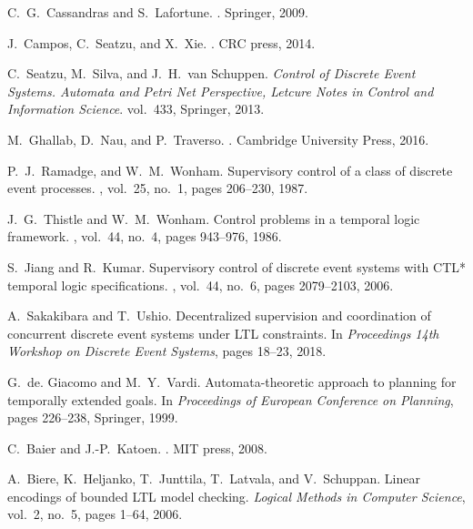 \documentclass{article}
\begin{document}
\begin{thebibliography}{99}

%
C.~G.~Cassandras and S.~Lafortune.
.
\newblock Springer, 2009.

%
J.~Campos, C.~Seatzu, and X.~Xie.
.
\newblock CRC press, 2014.

%
C.~Seatzu, M.~Silva, and J.~H.~van Schuppen.
\newblock \emph{Control of Discrete Event Systems. Automata and Petri Net Perspective, Letcure Notes in Control and Information Science}. vol.~433,
\newblock Springer, 2013.

M.~Ghallab, D.~Nau, and P.~Traverso.
.
\newblock Cambridge University Press, 2016.

%
P.~J.~Ramadge, and W.~M.~Wonham.
\newblock Supervisory control of a class of discrete event processes.
, vol.~25, no.~1, pages 206--230, 1987.

%
J.~G.~Thistle and W.~M.~Wonham.
\newblock Control problems in a temporal logic framework.
, vol.~44, no.~4, pages 943--976, 1986.

%
S.~Jiang and R.~Kumar.
\newblock Supervisory control of discrete event systems with CTL* temporal logic specifications.
, vol.~44, no.~6, pages 2079--2103, 2006.

%
A.~Sakakibara and T.~Ushio.
\newblock Decentralized supervision and coordination of concurrent discrete event systems under LTL constraints.
\newblock In \emph{Proceedings 14th Workshop on Discrete Event Systems}, pages 18--23, 2018.

%
G.~de. Giacomo and M.~Y.~Vardi.
\newblock Automata-theoretic approach to planning for temporally extended goals.
\newblock In {\em Proceedings of European Conference on Planning}, pages 226--238, Springer, 1999.

%
C.~Baier and J.-P.~Katoen.
.
\newblock MIT press, 2008.

%
A.~Biere, K.~Heljanko, T.~Junttila, T.~Latvala, and V.~Schuppan.
\newblock Linear encodings of bounded LTL model checking.
\newblock \emph{Logical Methods in Computer Science}, vol.~2, no.~5, pages 1--64, 2006.


\end{thebibliography}
\end{document}
